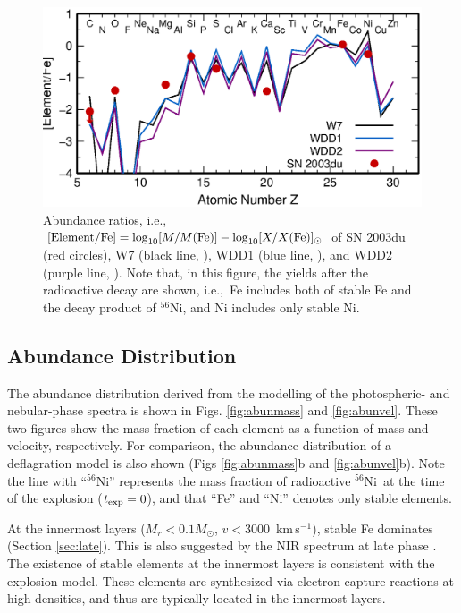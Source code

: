 \documentclass[usegraphicx,usenatbib]{mn2e}
\newcommand{\kms}{\mbox{\,km\,s$^{-1}$}}
\newcommand{\ie}{i.e.,\ }
\newcommand{\Msun}{M_{\odot}}
\newcommand{\Nifs}{$^{56}$Ni}
\newcommand{\texp}{t_{\rm exp}}
\begin{document}
\begin{figure}
  \includegraphics[scale=0.70]{f9.eps} 
  \caption{ 
Abundance ratios, \ie
$[{\rm Element / Fe}] = {\rm log}_{10}[M/M({\rm Fe})] - {\rm log}_{10}[X/X({\rm Fe})]_{\odot}$
of SN 2003du (red circles), W7 (black line, \citealt{nomoto84}), 
WDD1 (blue line, \citealt{iwamoto99}), and WDD2 (purple line, \citealt{iwamoto99}).
Note that, in this figure, the yields after the radioactive decay are shown,
\ie Fe includes both of stable Fe and the decay product of \Nifs, 
and Ni includes only stable Ni.
}
\label{fig:yield}
\end{figure}
\subsection{Abundance Distribution}
\label{sec:distribution}

The abundance distribution derived from the modelling of the photospheric- and
nebular-phase spectra is shown in Figs. \ref{fig:abunmass} and
\ref{fig:abunvel}. These two figures show the mass fraction of each element as a
function of mass and velocity, respectively. For comparison, the abundance
distribution of a deflagration model \citep[W7,][]{nomoto84} is also shown 
(Figs \ref{fig:abunmass}b and \ref{fig:abunvel}b).  Note the line with ``\Nifs''
represents the mass fraction of radioactive \Nifs\ at the time of the explosion
($\texp=0$), and that ``Fe'' and ``Ni'' denotes only stable elements.

At the innermost layers ($M_r < 0.1 \Msun$, $v < 3000$ \kms), stable Fe 
dominates (Section \ref{sec:late}). This is also suggested by the NIR spectrum
at late phase \citep{hoeflich04,motohara06}. The existence of stable elements at
the innermost layers is consistent with the explosion model. These elements are
synthesized via electron capture reactions at high densities, and thus are
typically located in the innermost layers.
\end{document}
